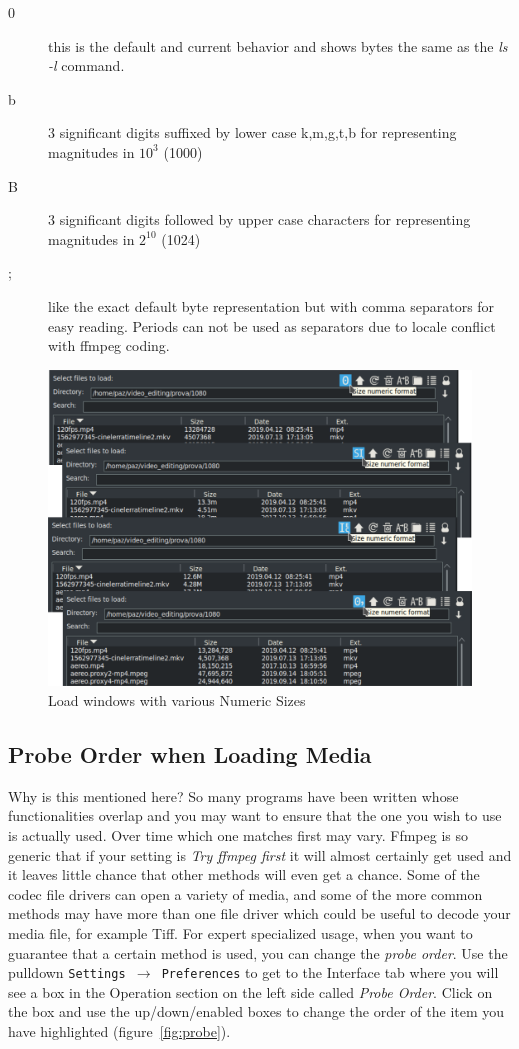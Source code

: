\begin{description}
    \item[0] this is the default and current behavior and shows bytes the same as the \textit{ls -l} command.
    \item[b] 3 significant digits suffixed by lower case k,m,g,t,b for representing magnitudes in $10^3$ (1000)
    \item[B] 3 significant digits followed by upper case characters for representing magnitudes in $2^{10}$ (1024)
    \item[;] like the exact default byte representation but with comma separators for easy reading.  Periods can
    not be used as separators due to locale conflict with ffmpeg coding.
\end{description}

\begin{figure}[htpb]
    \centering
    \includegraphics[width=0.9\linewidth]{images/load-size.png}
    \caption{Load windows with various Numeric Sizes}
    \label{fig:load-size}
\end{figure}

\subsection{Probe Order when Loading Media}%
\label{sub:probe_order_loading_media}

Why is this mentioned here?  So many programs have been written whose functionalities overlap and you may want to ensure that the one you wish to use is actually used.  Over time which one matches first may vary.  Ffmpeg is so generic that if your setting is \textit{Try ffmpeg first} it will almost certainly get used and it leaves little chance that other methods will even get a chance.  Some of the codec file drivers can open a variety of media, and some of the more common methods may have more than one file driver which could be useful to decode your media file, for example Tiff.  For expert specialized usage, when you want to guarantee that a certain method is used, you can change the \textit{probe order}.  Use the pulldown \texttt{Settings $\rightarrow$ Preferences} to get to the Interface tab where you will see a box in the Operation section on the left side called \textit{Probe Order}.  Click on the box and use the up/down/enabled boxes to change the order of the item you have highlighted (figure~\ref{fig:probe}).

